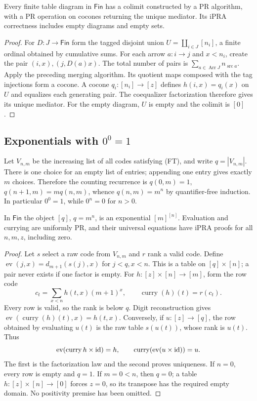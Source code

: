 \begin{theorem}\label{thm:finite-colimit}
Every finite table diagram in $\mathsf{Fin}$ has a colimit constructed
by a PR algorithm, with a PR operation on cocones returning the unique
mediator. Its iPRA correctness includes empty diagrams and empty sets.
\end{theorem}
\begin{proof}
For $D:J\to\mathsf{Fin}$ form the tagged disjoint union
$U=\coprod_{i\in J}[n_i]$, a finite ordinal obtained by cumulative sums.
For each arrow $a:i\to j$ and $x<n_i$, create the pair
$(i,x),(j,D(a)x)$. The total number of pairs is
$\sum_{a\in\operatorname{Arr}J}n_{\operatorname{src}a}$.
Apply the preceding merging algorithm. Its quotient maps composed with
the tag injections form a cocone. A cocone $q_i:[n_i]\to[z]$
defines $h(i,x)=q_i(x)$ on $U$ and equalizes each generating pair.
The coequalizer factorization therefore gives its unique mediator.
For the empty diagram, $U$ is empty and the colimit is $[0]$.
\end{proof}

\subsection{Exponentials with \texorpdfstring{$0^0=1$}{0 to power 0 equals 1}}
Let $V_{n,m}$ be the increasing list of all codes satisfying (FT), and
write $q=|V_{n,m}|$. There is one choice for an empty list of entries;
appending one entry gives exactly $m$ choices. Therefore the counting
recurrence is $q(0,m)=1$, $q(n+1,m)=m q(n,m)$, whence
$q(n,m)=m^n$ by quantifier-free induction. In particular $0^0=1$,
while $0^n=0$ for $n>0$.

\begin{theorem}\label{thm:finite-ccc}
In $\mathsf{Fin}$ the object $[q]$, $q=m^n$, is an exponential
$[m]^{[n]}$. Evaluation and currying are uniformly PR, and their
universal equations have iPRA proofs for all $n,m,z$, including zero.
\end{theorem}
\begin{proof}
Let $s$ select a raw code from $V_{n,m}$ and $r$ rank a valid code.
Define $\operatorname{ev}(j,x)=d_{m+1}(s(j),x)$ for $j<q,x<n$.
This is a table on $[q]\times[n]$; a pair never exists if one factor
is empty. For $h:[z]\times[n]\to[m]$, form the row code
\[
 c_t=\sum_{x<n}h(t,x)(m+1)^x,
 \qquad\operatorname{curry}(h)(t)=r(c_t).
\]
Every row is valid, so the rank is below $q$. Digit reconstruction gives
$\operatorname{ev}(\operatorname{curry}(h)(t),x)=h(t,x)$.
Conversely, if $u:[z]\to[q]$, the row obtained by evaluating $u(t)$
is the raw table $s(u(t))$, whose rank is $u(t)$. Thus
\[
 \operatorname{ev}(\operatorname{curry}h\times\operatorname{id})=h,
 \qquad\operatorname{curry}(\operatorname{ev}(u\times\operatorname{id}))=u.
\]
The first is the factorization law and the second proves uniqueness.
If $n=0$, every row is empty and $q=1$. If $m=0<n$, then $q=0$;
a table $h:[z]\times[n]\to[0]$ forces $z=0$, so its transpose
has the required empty domain. No positivity premise has been omitted.
\end{proof}

